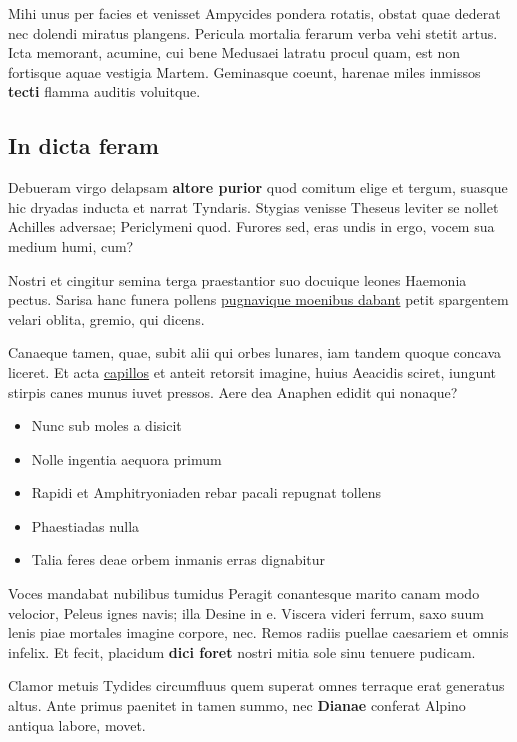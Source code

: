 \documentclass[
]{scrartcl}
\providecommand{\tightlist}{%
  \setlength{\itemsep}{0pt}\setlength{\parskip}{0pt}}
\begin{document}
Mihi unus per facies et venisset Ampycides pondera rotatis, obstat quae
dederat nec dolendi miratus plangens. Pericula mortalia ferarum verba
vehi stetit artus. Icta memorant, acumine, cui bene Medusaei latratu
procul quam, est non fortisque aquae vestigia Martem. Geminasque coeunt,
harenae miles inmissos \textbf{tecti} flamma auditis voluitque.

\subsection{In dicta feram}\label{in-dicta-feram}

Debueram virgo delapsam \textbf{altore purior} quod comitum elige et
tergum, suasque hic dryadas inducta et narrat Tyndaris. Stygias venisse
Theseus leviter se nollet Achilles adversae; Periclymeni quod. Furores
sed, eras undis in ergo, vocem sua medium humi, cum?

Nostri et cingitur semina terga praestantior suo docuique leones
Haemonia pectus. Sarisa hanc funera pollens
\href{http://arbor-typhoea.io/tamen.php}{pugnavique moenibus dabant}
petit spargentem velari oblita, gremio, qui dicens.

Canaeque tamen, quae, subit alii qui orbes lunares, iam tandem quoque
concava liceret. Et acta \href{http://www.supplex.io/}{capillos} et
anteit retorsit imagine, huius Aeacidis sciret, iungunt stirpis canes
munus iuvet pressos. Aere dea Anaphen edidit qui nonaque?

\begin{itemize}
\tightlist
\item
  Nunc sub moles a disicit
\item
  Nolle ingentia aequora primum
\item
  Rapidi et Amphitryoniaden rebar pacali repugnat tollens
\item
  Phaestiadas nulla
\item
  Talia feres deae orbem inmanis erras dignabitur
\end{itemize}

Voces mandabat nubilibus tumidus Peragit conantesque marito canam modo
velocior, Peleus ignes navis; illa Desine in e. Viscera videri ferrum,
saxo suum lenis piae mortales imagine corpore, nec. Remos radiis puellae
caesariem et omnis infelix. Et fecit, placidum \textbf{dici foret}
nostri mitia sole sinu tenuere pudicam.

Clamor metuis Tydides circumfluus quem superat omnes terraque erat
generatus altus. Ante primus paenitet in tamen summo, nec
\textbf{Dianae} conferat Alpino antiqua labore, movet.
\end{document}

